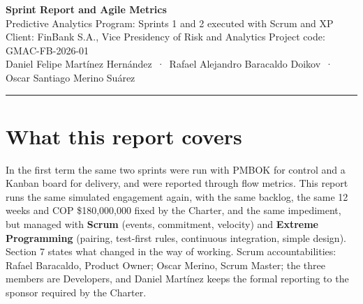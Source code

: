 \documentclass[10pt,a4paper]{article}
\begin{document}
\begin{center}
{\Large\bfseries Sprint Report and Agile Metrics}\\[2pt]
Predictive Analytics Program: Sprints 1 and 2 executed with Scrum and XP\\[2pt]
{\small Client: FinBank S.A., Vice Presidency of Risk and Analytics \quad Project code: GMAC-FB-2026-01}\\
{\small Daniel Felipe Martínez Hernández \,·\, Rafael Alejandro Baracaldo Doikov \,·\, Oscar Santiago Merino Suárez}
\end{center}
\vspace{-6pt}\rule{\linewidth}{0.4pt}

\section{What this report covers}
In the first term the same two sprints were run with PMBOK for control and a Kanban board for delivery,
and were reported through flow metrics. This report runs the same simulated engagement again, with the same backlog,
the same 12 weeks and COP \$180,000,000 fixed by the Charter, and the same impediment, but managed with
\textbf{Scrum} (events, commitment, velocity) and \textbf{Extreme Programming} (pairing, test-first rules, continuous
integration, simple design). Section 7 states what changed in the way of working. Scrum accountabilities:
Rafael Baracaldo, Product Owner; Oscar Merino, Scrum Master; the three members are Developers, and Daniel
Martínez keeps the formal reporting to the sponsor required by the Charter.
\end{document}
